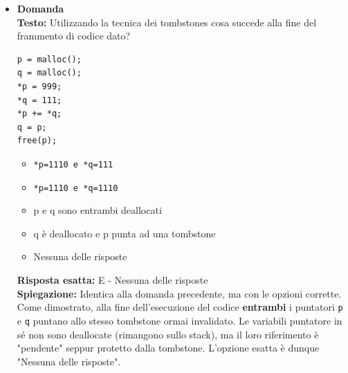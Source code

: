 \documentclass[12pt, a4paper]{article}
\newcounter{domandateoria}
\begin{document}
\begin{itemize}
    \item {}\textbf{Domanda \thedomandateoria} \\
    \textbf{Testo:} Utilizzando la tecnica dei tombstones cosa succede alla fine del frammento di codice dato?
\begin{verbatim}
p = malloc();
q = malloc();
*p = 999;
*q = 111;
*p += *q;
q = p;
free(p);
\end{verbatim}
    \begin{itemize}
        \item[A)] \texttt{*p=1110 e *q=111}
        \item[B)] \texttt{*p=1110 e *q=1110}
        \item[C)] p e q sono entrambi deallocati
        \item[D)] q è deallocato e p punta ad una tombstone
        \item[E)] Nessuna delle risposte
    \end{itemize}
    \textbf{Risposta esatta:} E - Nessuna delle risposte \\
    \textbf{Spiegazione:} Identica alla domanda precedente, ma con le opzioni corrette. Come dimostrato, alla fine dell'esecuzione del codice \textbf{entrambi} i puntatori \texttt{p} e \texttt{q} puntano allo stesso tombstone ormai invalidato. Le variabili puntatore in sé non sono deallocate (rimangono sullo stack), ma il loro riferimento è "pendente" seppur protetto dalla tombstone. L'opzione esatta è dunque "Nessuna delle risposte".
    \vspace{0.3cm}


\end{itemize}
\end{document}
